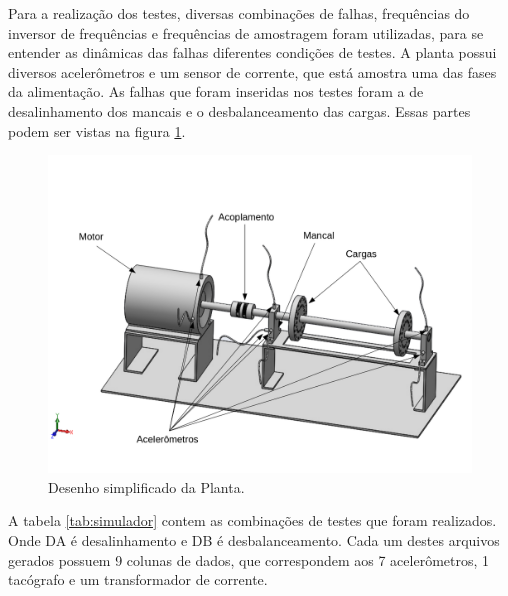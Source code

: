 Para a realização dos testes, diversas combinações de falhas, frequências do inversor de frequências e frequências de amostragem foram
utilizadas, para se entender as dinâmicas das falhas diferentes condições de testes. A planta possui diversos acelerômetros e um sensor
de corrente, que está amostra uma das fases da alimentação. As falhas que foram inseridas nos testes foram a de desalinhamento dos
mancais e o desbalanceamento das cargas. Essas partes podem ser vistas na figura \ref{fig:lateral_desenho}.

\begin{figure}[H]
    \caption{Desenho simplificado da Planta.}
    \begin{center}
        \includegraphics[scale=.5]{metodologia/img/lateral_desenho.png}
    \end{center}
    \label{fig:lateral_desenho}
\end{figure}

A tabela \ref{tab:simulador} contem as combinações de testes que foram realizados. Onde DA é desalinhamento e DB é desbalanceamento.
Cada um destes arquivos gerados possuem 9 colunas de dados, que correspondem aos 7 acelerômetros, 1 tacógrafo e um transformador de
corrente.

